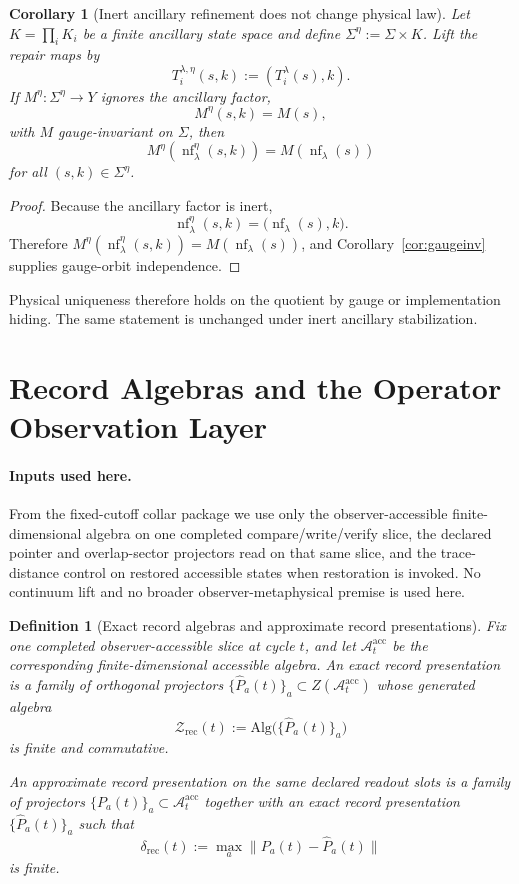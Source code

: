 \documentclass[11pt]{article}
\newtheorem{corollary}[theorem]{Corollary}
\newtheorem{definition}[theorem]{Definition}
\theoremstyle{remark}
\theoremstyle{plain}
\begin{document}
\begin{corollary}[Inert ancillary refinement does not change physical law]\label{cor:ancilla}
Let \(K=\prod_i K_i\) be a finite ancillary state space and define \(\Sigma^\eta:=\Sigma\times K\). Lift the repair maps by
\[
T_i^{\lambda,\eta}(s,k):=(T_i^\lambda(s),k).
\]
If \(M^\eta:\Sigma^\eta\to Y\) ignores the ancillary factor,
\[
M^\eta(s,k)=M(s),
\]
with \(M\) gauge-invariant on \(\Sigma\), then
\[
M^\eta(\operatorname{nf}_\lambda^\eta(s,k))
=
M(\operatorname{nf}_\lambda(s))
\]
for all \((s,k)\in\Sigma^\eta\).
\end{corollary}

\begin{proof}
Because the ancillary factor is inert,
\[
\operatorname{nf}_\lambda^\eta(s,k)=\bigl(\operatorname{nf}_\lambda(s),k\bigr).
\]
Therefore \(M^\eta(\operatorname{nf}_\lambda^\eta(s,k))=M(\operatorname{nf}_\lambda(s))\), and Corollary~\ref{cor:gaugeinv} supplies gauge-orbit independence.
\end{proof}

Physical uniqueness therefore holds on the quotient by gauge or implementation hiding. The same
statement is unchanged under inert ancillary stabilization.


\section{Record Algebras and the Operator Observation Layer}

\paragraph{Inputs used here.}
From the fixed-cutoff collar package we use only the observer-accessible finite-dimensional algebra
on one completed compare/write/verify slice, the declared pointer and overlap-sector projectors
read on that same slice, and the trace-distance control on restored accessible states when
restoration is invoked. No continuum lift and no broader observer-metaphysical premise is used
here.

\begin{definition}[Exact record algebras and approximate record presentations]\label{def:lattice}
Fix one completed observer-accessible slice at cycle \(t\), and let
\(\mathcal A_t^{\mathrm{acc}}\) be the corresponding finite-dimensional accessible algebra. An
\emph{exact record presentation} is a family of orthogonal projectors
\(\{\widehat P_a(t)\}_a\subset Z(\mathcal A_t^{\mathrm{acc}})\) whose generated algebra
\[
\mathcal Z_{\mathrm{rec}}(t)
:=
\mathrm{Alg}\bigl(\{\widehat P_a(t)\}_a\bigr)
\]
is finite and commutative.

An \emph{approximate record presentation} on the same declared readout slots is a family of
projectors \(\{P_a(t)\}_a\subset \mathcal A_t^{\mathrm{acc}}\) together with an exact record
presentation \(\{\widehat P_a(t)\}_a\) such that
\[
\delta_{\mathrm{rec}}(t)
:=
\max_a \|P_a(t)-\widehat P_a(t)\|
\]
is finite.
\end{definition}
\end{document}
